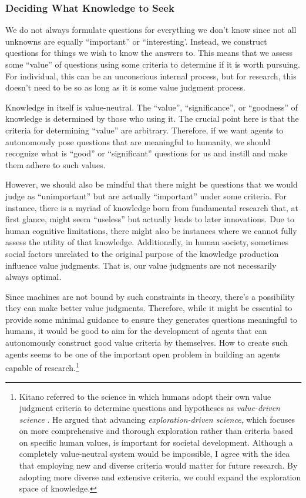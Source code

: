 \subsubsection{Deciding What Knowledge to Seek}
\label{section-deciding-what-knowledge-to-seek}
We do not always formulate questions for everything we don't know since not all unknowns are equally ``important'' or ``interesting'. Instead, we construct questions for things we wish to know the answers to. This means that we assess some ``value'' of questions using some criteria to determine if it is worth pursuing. For individual, this can be an unconscious internal process, but for research, this doesn't need to be so as long as it is some value judgment process.

Knowledge in itself is value-neutral. The ``value'', ``significance'', or ``goodness'' of knowledge is determined by those who using it. The crucial point here is that the criteria for determining ``value'' are arbitrary. Therefore, if we want agents to autonomously pose questions that are meaningful to humanity, we should recognize what is ``good'' or ``significant'' questions for us and instill and make them adhere to such values. 

However, we should also be mindful that there might be questions that we would judge as ``unimportant'' but are actually ``important'' under some criteria. For instance, there is a myriad of knowledge born from fundamental research that, at first glance, might seem ``useless'' but actually leads to later innovations. Due to human cognitive limitations, there might also be instances where we cannot fully assess the utility of that knowledge. Additionally, in human society, sometimes social factors unrelated to the original purpose of the knowledge production influence value judgments. That is, our value judgments are not necessarily always optimal.

Since machines are not bound by such constraints in theory, there's a possibility they can make better value judgments. Therefore, while it might be essential to provide some minimal guidance to ensure they generates questions meaningful to humans, it would be good to aim for the development of agents that can autonomously construct good value criteria by themselves. How to create such agents seems to be one of the important open problem in building an agents capable of research.\footnote{
Kitano referred to the science in which humans adopt their own value judgment criteria to determine questions and hypotheses as \textit{value-driven science} \cite{kitano2021nobel}. He argued that advancing \textit{exploration-driven science}, which focuses on more comprehensive and thorough exploration rather than criteria based on specific human values, is important for societal development. Although a completely value-neutral system would be impossible, I agree with the idea that employing new and diverse criteria would matter for future research. By adopting more diverse and extensive criteria, we could expand the exploration space of knowledge.
} 


